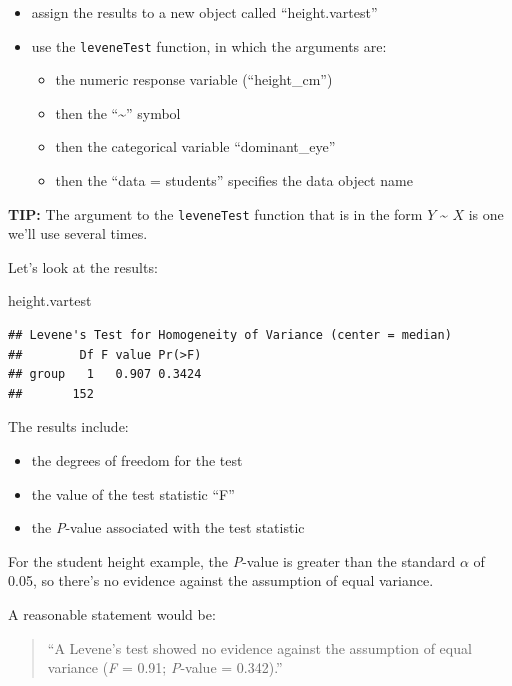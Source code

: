 \documentclass[
]{book}
\newenvironment{Shaded}{\begin{snugshade}}{\end{snugshade}}
\newcommand{\NormalTok}[1]{#1}
\providecommand{\tightlist}{%
  \setlength{\itemsep}{0pt}\setlength{\parskip}{0pt}}
\begin{document}
\begin{itemize}
\tightlist
\item
  assign the results to a new object called ``height.vartest''
\item
  use the \texttt{leveneTest} function, in which the arguments are:

  \begin{itemize}
  \tightlist
  \item
    the numeric response variable (``height\_cm'')
  \item
    then the ``\textasciitilde{}'' symbol
  \item
    then the categorical variable ``dominant\_eye''
  \item
    then the ``data = students'' specifies the data object name
  \end{itemize}
\end{itemize}

\textbf{TIP: }
The argument to the \texttt{leveneTest} function that is in the form \(Y\) \textasciitilde{} \(X\) is one we'll use several times.

Let's look at the results:

\begin{Shaded}
\begin{Highlighting}[]
\NormalTok{height.vartest}
\end{Highlighting}
\end{Shaded}

\begin{verbatim}
## Levene's Test for Homogeneity of Variance (center = median)
##        Df F value Pr(>F)
## group   1   0.907 0.3424
##       152
\end{verbatim}

The results include:

\begin{itemize}
\tightlist
\item
  the degrees of freedom for the test
\item
  the value of the test statistic ``F''
\item
  the \emph{P}-value associated with the test statistic
\end{itemize}

For the student height example, the \emph{P}-value is greater than the standard \(\alpha\) of 0.05, so there's no evidence against the assumption of equal variance.

A reasonable statement would be:

\begin{quote}
``A Levene's test showed no evidence against the assumption of equal variance (\emph{F} = 0.91; \emph{P}-value = 0.342).''
\end{quote}
\end{document}
